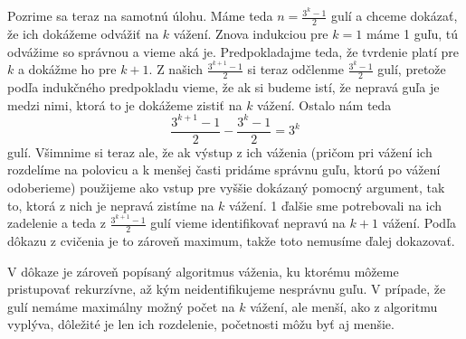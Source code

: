 Pozrime sa teraz na samotnú úlohu. Máme teda $n=\frac{3^k-1}{2}$ gulí 
a chceme dokázať, že ich dokážeme odvážiť na $k$ vážení. Znova 
indukciou pre $k=1$ máme 1 guľu, tú odvážime so správnou a vieme 
aká je. Predpokladajme teda, že tvrdenie platí pre $k$ a dokážme ho 
pre $k+1$. Z našich $\frac{3^{k+1}-1}{2}$ si teraz odčlenme 
$\frac{3^k-1}{2}$ gulí, pretože podľa indukčného predpokladu vieme, 
že ak si budeme istí, že nepravá guľa je medzi nimi, ktorá to je 
dokážeme zistiť na $k$ vážení. Ostalo nám teda 
\[\dfrac{3^{k+1}-1}{2}-\dfrac{3^k-1}{2}=3^k\]
gulí. Všimnime si teraz ale, že ak výstup z ich váženia (pričom pri 
vážení ich rozdelíme na polovicu a k menšej časti pridáme správnu 
guľu, ktorú po vážení odoberieme) použijeme ako vstup pre vyššie 
dokázaný pomocný argument, tak to, ktorá z nich je nepravá zistíme 
na $k$ vážení. 1 ďalšie sme potrebovali na ich zadelenie a teda 
z $\frac{3^{k+1}-1}{2}$ gulí vieme identifikovať nepravú na $k+1$ 
vážení. Podľa dôkazu z cvičenia je to zároveň maximum, takže toto 
nemusíme ďalej dokazovať. 

V dôkaze je zároveň popísaný algoritmus váženia, ku ktorému môžeme 
pristupovať rekurzívne, až kým neidentifikujeme nesprávnu guľu. 
V prípade, že gulí nemáme maximálny možný počet na $k$ vážení, ale 
menší, ako z algoritmu vyplýva, dôležité je len ich rozdelenie, 
početnosti môžu byť aj menšie.

